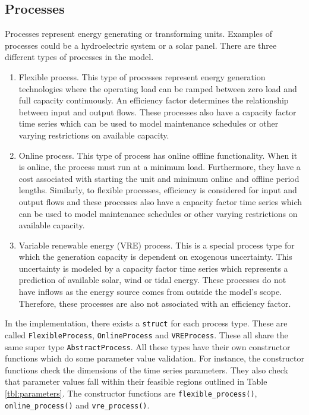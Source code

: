 \documentclass{article}
\begin{document}
\subsection{Processes}
Processes represent energy generating or transforming units. Examples of processes could be a hydroelectric system or a solar panel. There are three different types of processes in the model. 
\begin{enumerate}
    \item Flexible process. This type of processes represent energy generation technologies where the operating load can be ramped between zero load and full capacity continuously. An efficiency factor determines the relationship between input and output flows. These processes also have a capacity factor time series which can be used to model maintenance schedules or other varying restrictions on available capacity.
    
    \item Online process. This type of process has online offline functionality. When it is online, the process must run at a minimum load. Furthermore, they have a cost associated with starting the unit and minimum online and offline period lengths. Similarly, to flexible processes, efficiency is considered for input and output flows and these processes also have a capacity factor time series which can be used to model maintenance schedules or other varying restrictions on available capacity.
    
    \item Variable renewable energy (VRE) process. This is a special process type for which the generation capacity is dependent on exogenous uncertainty. This uncertainty is modeled by a capacity factor time series which represents a prediction of available solar, wind or tidal energy. These processes do not have inflows as the energy source comes from outside the model's scope. Therefore, these processes are also not associated with an efficiency factor.
    
\end{enumerate}

In the implementation, there exists a \texttt{struct} for each process type. These are called \texttt{FlexibleProcess}, \texttt{OnlineProcess} and \texttt{VREProcess}. These all share the same super type \texttt{AbstractProcess}. All these types have their own constructor functions which do some parameter value validation. For instance, the constructor functions check the dimensions of the time series parameters. They also check that parameter values fall within their feasible regions outlined in Table \ref{tbl:parameters}. The constructor functions are \texttt{flexible\_process()}, \texttt{online\_process()} and \texttt{vre\_process()}.
\end{document}
